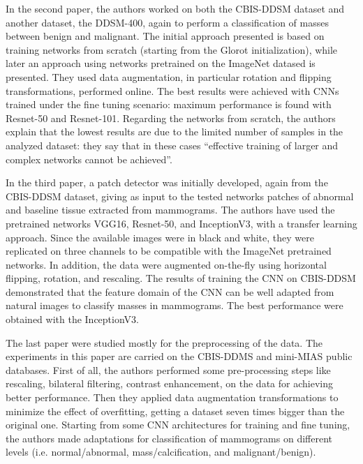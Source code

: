 \documentclass[11pt,a4paper,oneside]{article}
\begin{document}
In the second paper, the authors worked on both the CBIS-DDSM dataset and another dataset, the DDSM-400, again to perform a classification of masses between benign and malignant. The initial approach presented is based on training networks from scratch (starting from the Glorot initialization), while later an approach using networks pretrained on the ImageNet datased is presented. They used data augmentation, in particular rotation and flipping transformations, performed online. 
The best results were achieved with CNNs trained under the fine tuning scenario: maximum performance is found with Resnet-50 and Resnet-101. Regarding the networks from scratch, the authors explain that the lowest results are due to the limited number of samples in the analyzed dataset: they say that in these cases \enquote{effective training of larger and complex networks cannot be achieved}.

In the third paper, a patch detector was initially developed, again from the CBIS-DDSM dataset, giving as input to the tested networks patches of abnormal and baseline tissue extracted from mammograms. The authors have used the pretrained networks VGG16, Resnet-50, and InceptionV3, with a transfer learning approach. Since the available images were in black and white, they were replicated on three channels to be compatible with the ImageNet pretrained networks. In addition, the data were augmented on-the-fly using horizontal flipping, rotation, and rescaling. The results of training the CNN on CBIS-DDSM demonstrated that the feature domain of the CNN can be well adapted from natural images to classify masses in mammograms. The best performance were obtained with the InceptionV3.

The last paper were studied mostly for the preprocessing of the data. The experiments in this paper are carried on the CBIS-DDMS and mini-MIAS public databases. First of all, the authors performed some pre-processing steps like rescaling, bilateral filtering, contrast enhancement, on the data for achieving better performance. Then they applied data augmentation transformations to minimize the effect of overfitting, getting a dataset seven times bigger than the original one. Starting from some CNN architectures for training and fine tuning, the authors made adaptations for classification of mammograms on different levels (i.e. normal/abnormal, mass/calcification, and malignant/benign). 

\clearpage
\end{document}
